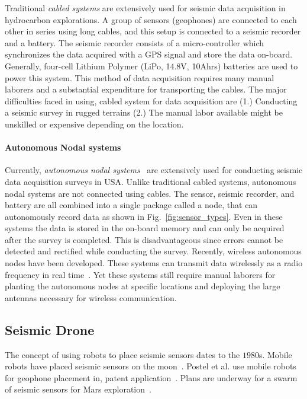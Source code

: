  Traditional \emph{cabled systems} are extensively used for seismic data acquisition in hydrocarbon explorations. A group of sensors (geophones) are connected to each other in series using long cables, and this setup is connected to a seismic recorder and a battery. The seismic recorder consists of a micro-controller which synchronizes the data acquired with a GPS signal and store the data on-board. Generally, four-cell Lithium Polymer (LiPo, 14.8V, 10Ahrs) batteries are used to power this system. This method of data acquisition requires many manual laborers and a substantial expenditure for transporting the cables. The major difficulties faced in using, cabled system for data acquisition are (1.) Conducting a seismic survey in rugged terrains (2.) The manual labor available might be unskilled or expensive depending on the location.  
 
 \paragraph{Autonomous Nodal systems}

 Currently, \emph{autonomous nodal systems}~\cite{wood1998distributed} are extensively used for conducting seismic data acquisition surveys in USA. Unlike traditional cabled systems, autonomous nodal systems are not connected using cables. The sensor, seismic recorder, and battery are all combined into a single package called a node, that can autonomously record data as shown in Fig.~\ref{fig:sensor_types}. Even in these systems the data is stored in the on-board memory and can only be acquired after the survey is completed. This is disadvantageous since errors cannot be detected and rectified while conducting the survey. Recently, wireless autonomous nodes have been developed. These systems can transmit data wirelessly as a radio frequency in real time~\cite{jiang2015geophysical}. Yet these systems still require manual laborers for planting the autonomous nodes at specific locations and deploying the large antennas necessary for wireless communication.
 
\subsection{Seismic Drone}  

The concept of using robots to place seismic sensors dates to the $1980$s. Mobile robots have placed seismic sensors on the moon~\cite{LSisMSE81}. Postel et al. use mobile robots for geophone placement in, patent application~\cite{DSSMaA14}. Plans are underway for a swarm of seismic sensors for Mars exploration~\cite{MAPL2006}.

